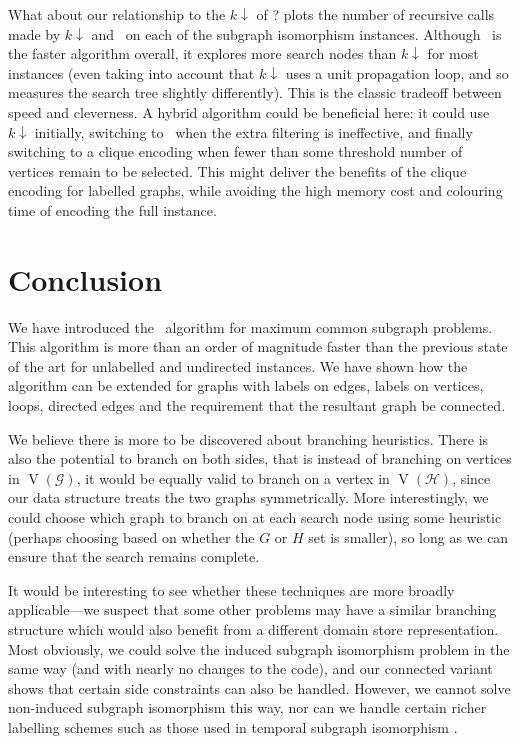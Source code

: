 \documentclass[letterpaper]{article}
\newcommand{\citet}[1]{\citeauthor{#1} \shortcite{#1}}
\newcommand{\citep}[1]{\cite{#1}}
\newcommand{\McSplit}{\textproc{McSplit}}
\newcommand{\graphG}{\mathcal{G}}
\newcommand{\graphH}{\mathcal{H}}
\newcommand{\setG}{G}
\newcommand{\setH}{H}
\DeclareMathOperator{\V}{V}
\begin{document}
What about our relationship to the $k{\downarrow}$ of
\citet{UpcomingAAAIPaper}?   plots the number of
recursive calls made by $k{\downarrow}$ and \McSplit\ on each of the subgraph
isomorphism instances. Although \McSplit\ is the faster algorithm overall, it
explores more search nodes than $k{\downarrow}$ for most instances (even taking
into account that $k{\downarrow}$ uses a unit propagation loop, and so measures
the search tree slightly differently). This is the classic tradeoff between
speed and cleverness. A hybrid algorithm could be beneficial here: it could use
$k{\downarrow}$ initially, switching to \McSplit\ when the extra filtering is
ineffective, and finally switching to a clique encoding when fewer than some
threshold number of vertices remain to be selected. This might deliver the
benefits of the clique encoding for labelled graphs, while avoiding the high
memory cost and colouring time of encoding the full instance.

\section{Conclusion}

We have introduced the \McSplit\ algorithm for maximum common subgraph
problems.  This algorithm is more than an order of magnitude faster than the
previous state of the art for unlabelled and undirected instances. We have
shown how the algorithm can be extended for graphs with labels on edges, labels
on vertices, loops, directed edges and the requirement that the resultant graph
be connected.

We believe there is more to be discovered about branching heuristics. There is
also the potential to branch on both sides, that is instead of branching on
vertices in $\V(\graphG)$, it would be equally valid to branch on a vertex in
$\V(\graphH)$, since our data structure treats the two graphs symmetrically. More
interestingly, we could choose which graph to branch on at each search node
using some heuristic (perhaps choosing based on whether the $\setG$ or $\setH$ set is
smaller), so long as we can ensure that the search remains complete.

It would be interesting to see whether these techniques are more broadly
applicable---we suspect that some other problems may have a similar branching
structure which would also benefit from a different domain store
representation. Most obviously, we could solve the induced subgraph isomorphism
problem in the same way (and with nearly no changes to the code), and our
connected variant shows that certain side constraints can also be handled.
However, we cannot solve non-induced subgraph isomorphism this way, nor can
we handle certain richer labelling schemes such as those used in temporal
subgraph isomorphism \citep{DBLP:conf/asunam/RedmondC13}.



\end{document}
